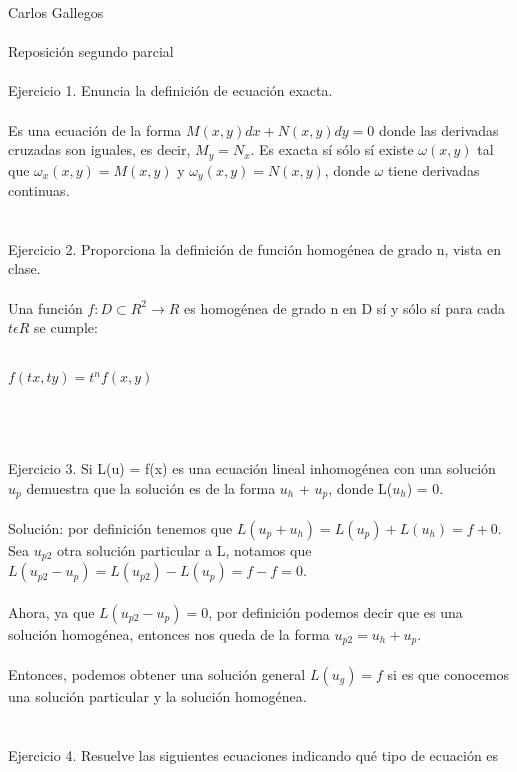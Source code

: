 \documentclass[a4paper,10pt]{article}
\title{}
\author{}
\date{}
\begin{document}
\maketitle
Carlos Gallegos\\\\
Reposición segundo parcial\\\\
Ejercicio 1. Enuncia la definición de ecuación exacta.\\\\
Es una ecuación de la forma $M(x,y)dx + N(x,y) dy = 0$ donde las derivadas cruzadas son iguales, es decir, $M_y=N_x$. Es exacta sí sólo sí existe $\omega (x,y)$ tal que $\omega_x (x,y)= M(x,y)$ y $\omega_y (x,y)= N(x,y)$, donde $\omega$ tiene derivadas continuas.\\\\\\
Ejercicio 2. Proporciona la definición de función homogénea de grado n, vista en clase.\\\\
Una función $f: D \subset R^2 \rightarrow R$ es homogénea de grado n en D sí y sólo sí para cada $t \epsilon R$ se cumple:\\\\
\centerline{$f(tx, ty) = t^n f(x,y)$}\\\\\\
Ejercicio 3. Si L(u) = f(x) es una ecuación lineal inhomogénea con una solución $u_p$ demuestra que la solución es de la forma $u_h$ + $u_p$, donde L($u_h$) = 0. 
\\\\
Solución: por definición tenemos que $L(u_p + u_h) = L(u_p) + L(u_h) = f + 0$. Sea $u_{p2}$ otra solución particular a L, notamos que $L(u_{p2} - u_p)=L(u_{p2}) - L(u_p) = f - f = 0$.\\\\
Ahora, ya que $L(u_{p2} - u_p) = 0$, por definición podemos decir que es una solución homogénea, entonces nos queda de la forma $u_{p2} = u_h + u_p$.\\\\
Entonces, podemos obtener una solución general $L(u_g)=f$ si es que conocemos una solución particular y la solución homogénea.
 \\\\\\
Ejercicio 4. Resuelve las siguientes ecuaciones indicando qué tipo de ecuación es\\\\
\end{document}
